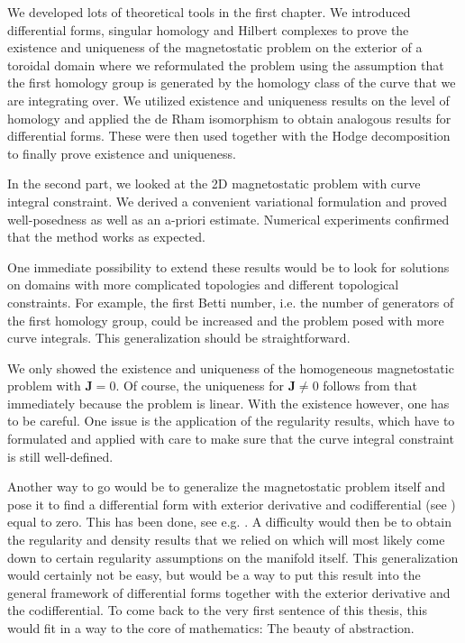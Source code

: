 \documentclass[../master_thesis.tex]{subfiles}
\begin{document}
We developed lots of theoretical tools in the first chapter. We introduced 
differential forms, singular homology and Hilbert complexes 
to prove the existence and uniqueness of the magnetostatic 
problem on the exterior of a toroidal domain where we reformulated the problem 
using the assumption that the first homology group is generated by the homology class 
of the curve that we are integrating over. We utilized existence and uniqueness results 
on the level of homology and applied the de Rham isomorphism to obtain analogous 
results for differential forms. These were then used together with the Hodge 
decomposition to finally prove existence and uniqueness.

In the second part, we looked at the 2D magnetostatic problem with curve integral 
constraint. We derived a convenient variational formulation and 
proved well-posedness as well as an a-priori estimate. Numerical experiments 
confirmed that the method works as expected.

One immediate possibility to extend these results would be to look for solutions on domains with more complicated 
topologies and different topological constraints. For example, the first Betti number, 
i.e. the number of generators of the first homology group, could be increased
and the problem posed with more curve integrals. This generalization should be 
straightforward. 

We only showed the existence and uniqueness of the homogeneous magnetostatic problem 
with $\mathbf{J}=0$. Of course, the uniqueness for $\mathbf{J} \neq 0$ follows from 
that immediately because the problem is linear. With the existence however, 
one has to be careful. One issue is the application of the regularity results,
which have to formulated and applied with care to make sure that the curve integral 
constraint is still well-defined. 

Another way to go would be to generalize the magnetostatic problem itself 
and pose it to find a differential form with exterior derivative and codifferential 
(see \cite[Sec.\,6.2.6]{arnold})
equal to zero. This has been done, see e.g. \cite[Chap.\,3]{schwarz}.
A difficulty would then be
to obtain the regularity and density results that we relied on which 
will most likely come down to certain regularity assumptions on the manifold itself.
This generalization would certainly not be easy, but would be a way to put 
this result into the general framework of differential forms together with 
the exterior derivative and the codifferential. To come back to the very
first sentence of this thesis, this would fit in a way to the core of 
mathematics: The beauty of abstraction.
\end{document}
